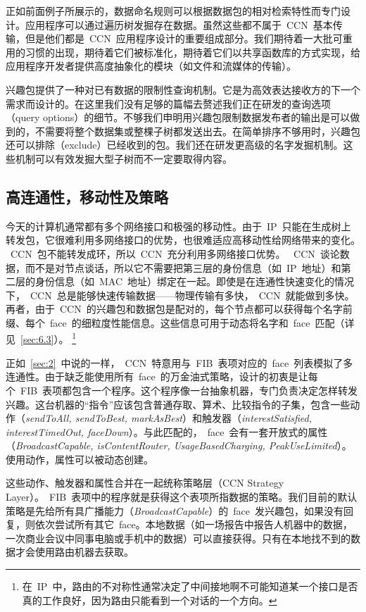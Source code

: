 正如前面例子所展示的，数据命名规则可以根据数据包的相对检索特性而专门设计。应用程序可以通过遍历树发掘存在数据。虽然这些都不属于~CCN~基本传输，但是他们都是~CCN~应用程序设计的重要组成部分。我们期待着一大批可重用的习惯的出现，期待着它们被标准化，期待着它们以共享函数库的方式实现，给应用程序开发者提供高度抽象化的模块（如文件和流媒体的传输）。

兴趣包提供了一种对已有数据的限制性查询机制。它是为高效表达接收方的下一个需求而设计的。在这里我们没有足够的篇幅去赘述我们正在研发的查询选项（query options）的细节。不够我们申明用兴趣包限制数据发布者的输出是可以做到的，不需要将整个数据集或整棵子树都发送出去。在简单排序不够用时，兴趣包还可以排除（exclude）已经收到的包。我们还在研发更高级的名字发掘机制。这些机制可以有效发掘大型子树而不一定要取得内容。

\subsection{高连通性，移动性及策略}
\label{sec:3.3}

今天的计算机通常都有多个网络接口和极强的移动性。由于~IP~只能在生成树上转发包，它很难利用多网络接口的优势，也很难适应高移动性给网络带来的变化。%
~CCN~包不能转发成环，所以~CCN~充分利用多网络接口优势。%
~CCN~谈论数据，而不是对节点谈话，所以它不需要把第三层的身份信息（如~IP~地址）和第二层的身份信息（如~MAC~地址）绑定在一起。即使是在连通性快速变化的情况下，~CCN~总是能够快速传输数据——物理传输有多快，~CCN~就能做到多快。再者，由于~CCN~的兴趣包和数据包是配对的，每个节点都可以获得每个名字前缀、每个~face~的细粒度性能信息。这些信息可用于动态将名字和~face~匹配（详见~\ref{sec:6.3}）。
\renewcommand\baselinestretch{1} %
\footnote{在~IP~中，路由的不对称性通常决定了中间接地啊不可能知道某一个接口是否真的工作良好，因为路由只能看到一个对话的一个方向。}

正如~\ref{sec:2}~中说的一样，~CCN~特意用与~FIB~表项对应的~face~列表模拟了多连通性。由于缺乏能使用所有~face~的万金油式策略，设计的初衷是让每个~FIB~表项都包含一个程序。这个程序像一台抽象机器，专门负责决定怎样转发兴趣。这台机器的“指令”应该包含普通存取、算术、比较指令的子集，包含一些动作（\emph{sendToAll, sendToBest, markAsBest}）和触发器（\emph{interestSatisfied, interestTimedOut, faceDown}）。与此匹配的，~face~会有一套开放式的属性（\emph{BroadcastCapable, isContentRouter, UsageBasedCharging, PeakUseLimited}）。使用动作，属性可以被动态创建。

这些动作、触发器和属性合并在一起统称策略层（CCN Strategy Layer）。~FIB~表项中的程序就是获得这个表项所指数据的策略。我们目前的默认策略是先给所有具广播能力（\emph{BroadcastCapable}）的~face~发兴趣包，如果没有回复，则依次尝试所有其它~face。本地数据（如一场报告中报告人机器中的数据，一次商业会议中同事电脑或手机中的数据）可以直接获得。只有在本地找不到的数据才会使用路由机器去获取。

